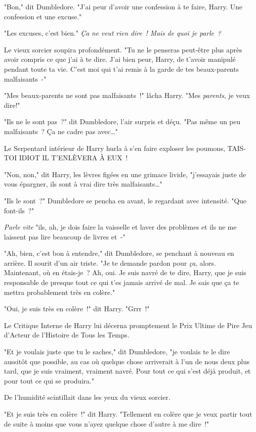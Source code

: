 "Bon," dit Dumbledore. "J'ai peur d'avoir une confession à te faire, Harry. Une confession et une excuse."

"Les excuses, c'est bien." \emph{Ça ne veut rien dire~! Mais de quoi je parle~?}

Le vieux sorcier soupira profondément. "Tu ne le penseras peut-être plus après avoir compris ce que j'ai à te dire. J'ai bien peur, Harry, de t'avoir manipulé pendant toute ta vie. C'est moi qui t'ai remis à la garde de tes beaux-parents malfaisants~-"

"Mes beaux-parents ne sont pas malfaisants~!" lâcha Harry. "Mes \emph{parents}, je veux dire!"

"Ils ne le sont pas~?" dit Dumbledore, l'air surpris et déçu. "Pas même un peu malfaisants~? Ça ne cadre pas avec…"

Le Serpentard intérieur de Harry hurla à s'en faire exploser les poumons, TAIS-TOI IDIOT IL T'ENLÈVERA À EUX~!

"Non, non," dit Harry, les lèvres figées en une grimace livide, "j'essayais juste de vous épargner, ils sont à vrai dire très malfaisants…"

"Ils le sont~?" Dumbledore se pencha en avant, le regardant avec intensité. "Que font-ils~?"

\emph{Parle vite} "ils, ah, je dois faire la vaisselle et laver des problèmes et ils ne me laissent pas lire beaucoup de livres et~-"

"Ah, bien, c'est bon à entendre," dit Dumbledore, se penchant à nouveau en arrière. Il sourit d'un air triste. "Je te demande pardon pour \emph{ça}, alors. Maintenant, où en étais-je~? Ah, oui. Je suis navré de te dire, Harry, que je suis responsable de presque tout ce qui t'es jamais arrivé de mal. Je sais que ça te mettra probablement très en colère."

"Oui, je suis très en colère~!" dit Harry. "Grrr~!"

Le Critique Interne de Harry lui décerna promptement le Prix Ultime de Pire Jeu d'Acteur de l'Histoire de Tous les Temps.

"Et je voulais juste que tu le saches," dit Dumbledore, "je voulais te le dire aussitôt que possible, au cas où quelque chose arriverait à l'un de nous deux plus tard, que je suis vraiment, vraiment navré. Pour tout ce qui s'est déjà produit, et pour tout ce qui se produira."

De l'humidité scintillait dans les yeux du vieux sorcier.

"Et je suis très en colère~!" dit Harry. "Tellement en colère que je veux partir tout de suite à moins que vous n'ayez quelque chose d'autre à me dire~!"

